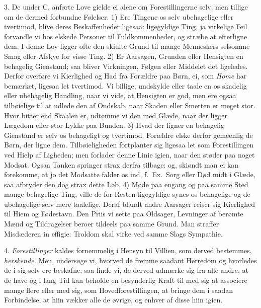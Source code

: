 \documentclass[12pt,a4paper]{article}
\newcommand{\opage}[1]{\marginnote{\footnotesize\textit{[#1]}}}
\begin{document}
3. De under C, anførte Love gielde ei alene om Forestillingerne selv, men tillige om de
dermed forbundne Følelser. 1) Ere Tingene os selv ubehagelige eller tvertimod, blive
deres Beskaffenheder ligesaa: ligegyldige Ting, ja virkelige Feil forvandle vi hos
elskede Personer til Fuldkommenheder, og stræbe at efterligne dem. I denne Lov ligger
ofte den skiulte Grund til mange Menneskers selsomme Smag eller Afskye for visse Ting.
2) Er Aarsagen, Grunden eller Hensigten en behagelig Gienstand; saa bliver Virkningen,
Følgen eller Middelet det ligeledes. Derfor overføre vi Kierlighed og Had fra Forældre
paa Børn, ei, som \emph{Home} har bemærket, ligesaa let tvertimod. Vi billige, undskylde
eller taale en os skadelig eller ubehagelig Handling, naar vi vide, at Hensigten er god,
men ere ogsaa tilbøielige til at udlede den af Ondskab, naar Skaden eller Smerten er
meget stor. Hvor bitter end Skaalen er, udtømme vi
\opage{100} den med Glæde, naar der ligger Lægedom eller stor Lykke paa Bunden. 3) Hvad der ligner en
behagelig Gienstand er selv os behageligt og tvertimod. Forældre elske derfor gemeenlig
de Børn, der ligne dem. Tilbøieligheden fortplanter sig ligesaa let som Forestillingen
ved Hielp af Ligheden; men forlader denne Linie igien, naar den støder paa noget Modsat.
Ogsaa Tanken springer strax derfra tilbage: og, skiøndt man ei kan forekomme, at jo det
Modsatte falder os ind, f.~Ex.\ Sorg eller Død midt i Glæde, saa afbryder den dog strax
dette Løb. 4) Møde paa engang og paa samme Sted mange behagelige Ting, ville de for Resten
ligegyldige synes os behagelige og de ubehagelige selv mere taalelige. Deraf blandt andre
Aarsager reiser sig Kierlighed til Hiem og Fødestavn. Den Priis vi sette paa Oldsager,
Levninger af berømte Mænd og Tildragelser beroer tildeels paa samme Grund. Man straffer
Misdæderen in effigie: Troldom skal virke ved samme Slags Sympathie.

4. \emph{Forestillinger} kaldes fornemmelig i Hensyn til Villien, som derved bestemmes,
\emph{herskende.} Men, undersøge vi, hvorved de fremme saadant Herredom og hvorledes de i
sig selv ere beskafne; saa finde vi, de derved udmærke sig fra alle andre, at de have og
i lang Tid kan beholde en besynderlig Kraft til med sig at associere mange flere eller
med sig, som Hovedforestillingen, at bringe dem i saadan Forbindelse, at hiin vækker alle
de øvrige, og enhver af disse hiin igien.
\end{document}

